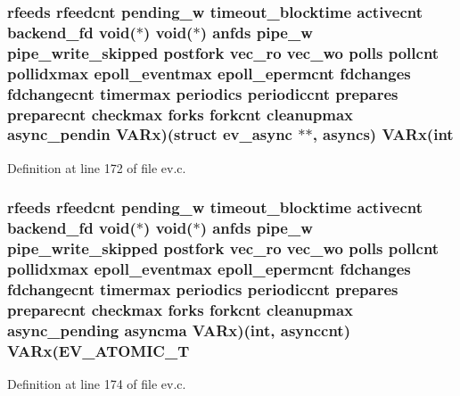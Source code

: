\hypertarget{structev__loop_af018eecb87b100ac3f95a72107e78a9a}{
\subsubsection[{\-V\-A\-Rx}]{ {\bf rfeeds} {\bf rfeedcnt} {\bf pending\-\_\-w} {\bf timeout\-\_\-blocktime} {\bf activecnt} {\bf backend\-\_\-fd} void($\ast$) void($\ast$) {\bf anfds} {\bf pipe\-\_\-w} {\bf pipe\-\_\-write\-\_\-skipped} {\bf postfork} {\bf vec\-\_\-ro} {\bf vec\-\_\-wo} {\bf polls} {\bf pollcnt} {\bf pollidxmax} {\bf epoll\-\_\-eventmax} {\bf epoll\-\_\-epermcnt} {\bf fdchanges} {\bf fdchangecnt} {\bf timermax} {\bf periodics} {\bf periodiccnt} {\bf prepares} {\bf preparecnt} {\bf checkmax} {\bf forks} {\bf forkcnt} {\bf cleanupmax} async\-\_\-pendin {\bf \-V\-A\-Rx})(struct {\bf ev\-\_\-async} $\ast$$\ast$, {\bf asyncs}) {\bf \-V\-A\-Rx}(int}}\label{structev__loop_af018eecb87b100ac3f95a72107e78a9a}


\-Definition at line 172 of file ev.\-c.

\hypertarget{structev__loop_a74a8333c5d2c0de84258507e42ec1bb7}{
\subsubsection[{\-V\-A\-Rx}]{ {\bf rfeeds} {\bf rfeedcnt} {\bf pending\-\_\-w} {\bf timeout\-\_\-blocktime} {\bf activecnt} {\bf backend\-\_\-fd} void($\ast$) void($\ast$) {\bf anfds} {\bf pipe\-\_\-w} {\bf pipe\-\_\-write\-\_\-skipped} {\bf postfork} {\bf vec\-\_\-ro} {\bf vec\-\_\-wo} {\bf polls} {\bf pollcnt} {\bf pollidxmax} {\bf epoll\-\_\-eventmax} {\bf epoll\-\_\-epermcnt} {\bf fdchanges} {\bf fdchangecnt} {\bf timermax} {\bf periodics} {\bf periodiccnt} {\bf prepares} {\bf preparecnt} {\bf checkmax} {\bf forks} {\bf forkcnt} {\bf cleanupmax} {\bf async\-\_\-pending} asyncma {\bf \-V\-A\-Rx})(int, {\bf asynccnt}) {\bf \-V\-A\-Rx}(\-E\-V\-\_\-\-A\-T\-O\-M\-I\-C\-\_\-\-T}}\label{structev__loop_a74a8333c5d2c0de84258507e42ec1bb7}


\-Definition at line 174 of file ev.\-c.

